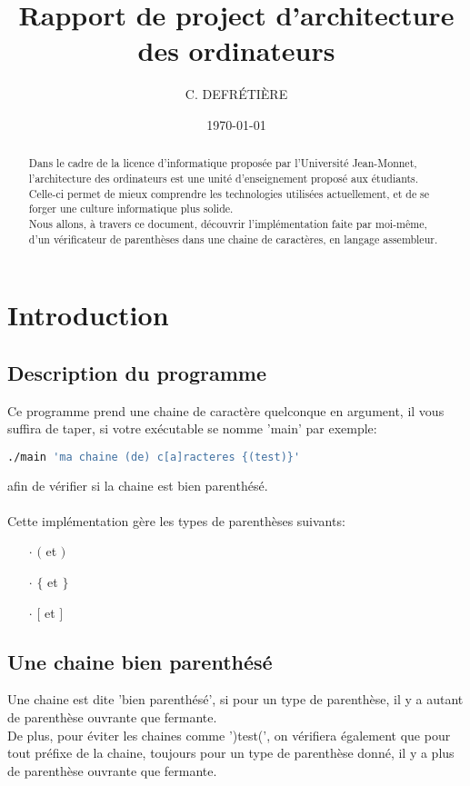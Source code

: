 \documentclass[11pt,a4paper]{article}
\title{Rapport de project d'architecture des ordinateurs}
\author{C. DEFRÉTIÈRE}
\date{\today}
\begin{document}
\maketitle

\begin{abstract}
Dans le cadre de la licence d'informatique proposée par l'Université Jean-Monnet, l'architecture des ordinateurs est une unité d'enseignement proposé aux étudiants. Celle-ci permet de mieux comprendre les technologies utilisées actuellement, et de se forger une culture informatique plus solide. \\
Nous allons, à travers ce document, découvrir l'implémentation faite par moi-même, d'un vérificateur de parenthèses dans une chaine de caractères, en langage assembleur.
\end{abstract}

\newpage
\tableofcontents
\newpage

\section{Introduction}

\subsection{Description du programme}
Ce programme prend une chaine de caractère quelconque en argument, il vous suffira de taper, si votre exécutable se nomme 'main' par exemple:
\begin{lstlisting}[language=bash]
	./main 'ma chaine (de) c[a]racteres {(test)}'
\end{lstlisting}
afin de vérifier si la chaine est bien parenthésé.\\ \\
Cette implémentation gère les types de parenthèses suivants:
\begin{itemize}
	\item[$\cdot$] $($ et $)$
	\item[$\cdot$] $ \lbrace $ et $ \rbrace $
	\item[$\cdot$] $ [ $ et $ ] $
\end{itemize}

\subsection{Une chaine bien parenthésé}
Une chaine est dite 'bien parenthésé', si pour un type de parenthèse, il y a autant de parenthèse ouvrante que fermante.\\
De plus, pour éviter les chaines comme ')test(', on vérifiera également que pour tout préfixe de la chaine, toujours pour un type de parenthèse donné, il y a plus de parenthèse ouvrante que fermante.
\end{document}
